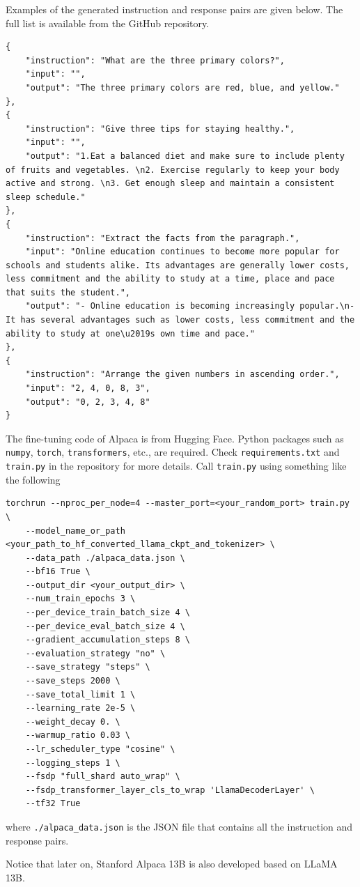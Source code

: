 Examples of the generated instruction and response pairs are given below. The full list is available from the GitHub repository.
\begin{lstlisting}
{
	"instruction": "What are the three primary colors?",
	"input": "",
	"output": "The three primary colors are red, blue, and yellow."
},
{
	"instruction": "Give three tips for staying healthy.",
	"input": "",
	"output": "1.Eat a balanced diet and make sure to include plenty of fruits and vegetables. \n2. Exercise regularly to keep your body active and strong. \n3. Get enough sleep and maintain a consistent sleep schedule."
},
{
	"instruction": "Extract the facts from the paragraph.",
	"input": "Online education continues to become more popular for schools and students alike. Its advantages are generally lower costs, less commitment and the ability to study at a time, place and pace that suits the student.",
	"output": "- Online education is becoming increasingly popular.\n- It has several advantages such as lower costs, less commitment and the ability to study at one\u2019s own time and pace."
},
{
	"instruction": "Arrange the given numbers in ascending order.",
	"input": "2, 4, 0, 8, 3",
	"output": "0, 2, 3, 4, 8"
}
\end{lstlisting}

The fine-tuning code of Alpaca is from Hugging Face. Python packages such as \verb|numpy|, \verb|torch|, \verb|transformers|, etc., are required. Check \verb|requirements.txt| and \verb|train.py| in the repository for more details. Call \verb|train.py| using something like the following
\begin{lstlisting}
torchrun --nproc_per_node=4 --master_port=<your_random_port> train.py \
	--model_name_or_path <your_path_to_hf_converted_llama_ckpt_and_tokenizer> \
	--data_path ./alpaca_data.json \
	--bf16 True \
	--output_dir <your_output_dir> \
	--num_train_epochs 3 \
	--per_device_train_batch_size 4 \
	--per_device_eval_batch_size 4 \
	--gradient_accumulation_steps 8 \
	--evaluation_strategy "no" \
	--save_strategy "steps" \
	--save_steps 2000 \
	--save_total_limit 1 \
	--learning_rate 2e-5 \
	--weight_decay 0. \
	--warmup_ratio 0.03 \
	--lr_scheduler_type "cosine" \
	--logging_steps 1 \
	--fsdp "full_shard auto_wrap" \
	--fsdp_transformer_layer_cls_to_wrap 'LlamaDecoderLayer' \
	--tf32 True
\end{lstlisting}
where \verb|./alpaca_data.json| is the JSON file that contains all the instruction and response pairs.

Notice that later on, Stanford Alpaca 13B is also developed based on LLaMA 13B.


